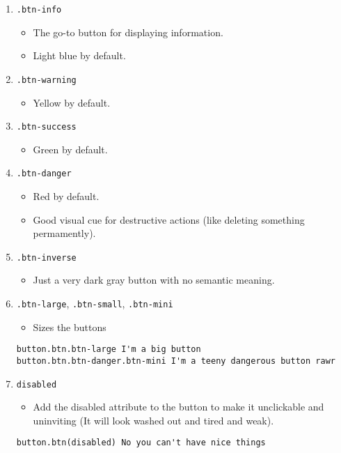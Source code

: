 \documentclass[12pt]{article}
\begin{document}
\begin{enumerate}
\begin{enumerate}
\item \texttt{.btn-info}
\begin{itemize}
\item The go-to button for displaying information.
\item Light blue by default.
\end{itemize}

\item \texttt{.btn-warning}
\begin{itemize}
\item Yellow by default.
\end{itemize}

\item \texttt{.btn-success}
\begin{itemize}
\item Green by default.
\end{itemize}

\item \texttt{.btn-danger}
\begin{itemize}
\item Red by default.
\item Good visual cue for destructive actions (like deleting something permamently).
\end{itemize}

\item \texttt{.btn-inverse}
\begin{itemize}
\item Just a very dark gray button with no semantic meaning.
\end{itemize}

\item \texttt{.btn-large}, \texttt{.btn-small}, \texttt{.btn-mini}
\begin{itemize}
\item Sizes the buttons
\end{itemize}
\begin{lstlisting}[frame=single]
button.btn.btn-large I'm a big button
button.btn.btn-danger.btn-mini I'm a teeny dangerous button rawr
\end{lstlisting}

\item \texttt{disabled}
\begin{itemize}
\item Add the disabled attribute to the button to make it unclickable and uninviting (It will look washed out and tired and weak).
\end{itemize}
\begin{lstlisting}[frame=single]
button.btn(disabled) No you can't have nice things
\end{lstlisting}

\end{enumerate}

\end{enumerate}
\end{document}
